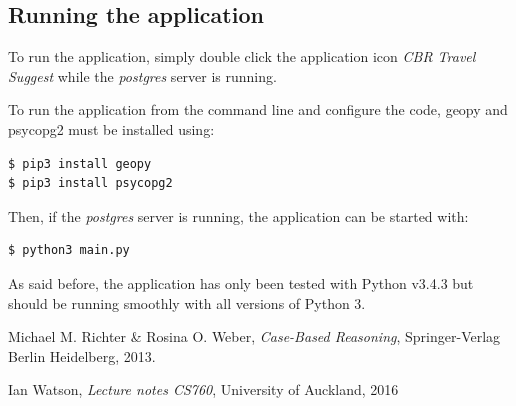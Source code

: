 \documentclass[12pt]{article}
\begin{document}
\subsection{Running the application}

To run the application, simply double click the application icon \textit{CBR Travel Suggest} while the \textit{postgres} server is running. 

To run the application from the command line and configure the code, geopy and psycopg2 must be installed using:

\begin{lstlisting}
$ pip3 install geopy
$ pip3 install psycopg2
\end{lstlisting}
Then, if the \textit{postgres} server is running, the application can be started with:

\begin{lstlisting}
$ python3 main.py
\end{lstlisting}
As said before, the application has only been tested with Python v3.4.3 but should be running smoothly with all versions of Python 3. 

\clearpage

\begin{thebibliography}{9}

Michael M. Richter \& Rosina O. Weber,
\emph{Case-Based Reasoning},
Springer-Verlag Berlin Heidelberg,
2013.

Ian Watson,
\emph{Lecture notes CS760},
University of Auckland,
2016


\end{thebibliography}
\end{document}

